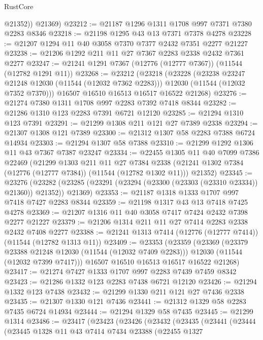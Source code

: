 \begin{lexlean}{RustCore}
\begin{coremodule}
          @21352))
      @21369)
@23212 := @21187 @1296 @1311 @1708 @997 @7371 @7380 @2283 @8346
@23218 := @21198 @1295 @43 @13 @7371 @7378 @4278
@23228 := @21207 @1294 @11 @40 @3058 @7370 @7377 @2432 @7351 @2277 @21227
@23238 := @21206 @1292 @211 @11 @27 @7367 @2283 @2338 @2432 @7361 @2277
@23247 := @21241 @1291 @7367 (@12776 (@12777 @7367)) (@11544 (@12782 @1291 @11))
@23268 := @23212
    (@23218
      (@23228
        (@23238 @23247 @21248 @12030 (@11544 (@12032 @7362 @2283)))
        @12030
        (@11544 (@12032 @7352 @7370)))
      @16507
      @16510
      @16513
      @16517
      @16522
      @21268)
@23276 := @21274 @7380 @1311 @1708 @997 @2283 @7392 @7418 @8344
@23282 := @21286 @1310 @123 @2283 @7391 @6721 @12120
@23285 := @21294 @1310 @123 @7391
@23291 := @21299 @1308 @211 @121 @27 @7389 @2338
@23294 := @21307 @1308 @121 @7389
@23300 := @21312 @1307 @58 @2283 @7388 @6724 @14934
@23303 := @21294 @1307 @58 @7388
@23310 := @21299 @1292 @1306 @11 @43 @7367 @7387 @23247
@23334 := @22455
    @1305
    @11
    @40
    @7099
    @7386
    @22469
    (@21299
      @1303
      @211
      @11
      @27
      @7384
      @2338
      (@21241 @1302 @7384 (@12776 (@12777 @7384)) (@11544 (@12782 @1302 @11)))
      @21352)
@23345 := @23276
    (@23282 (@23285 (@23291 (@23294 (@23300 (@23303 (@23310 @23334)) @21360)) @21352)) @21369)
@23353 := @21187 @1318 @1333 @1707 @997 @7418 @7427 @2283 @8344
@23359 := @21198 @1317 @43 @13 @7418 @7425 @4278
@23369 := @21207 @1316 @11 @40 @3058 @7417 @7424 @2432 @7398 @2277 @21227
@23379 := @21206 @1314 @211 @11 @27 @7414 @2283 @2338 @2432 @7408 @2277
@23388 := @21241 @1313 @7414 (@12776 (@12777 @7414)) (@11544 (@12782 @1313 @11))
@23409 := @23353
    (@23359
      (@23369
        (@23379 @23388 @21248 @12030 (@11544 (@12032 @7409 @2283)))
        @12030
        (@11544 (@12032 @7399 @7417)))
      @16507
      @16510
      @16513
      @16517
      @16522
      @21268)
@23417 := @21274 @7427 @1333 @1707 @997 @2283 @7439 @7459 @8342
@23423 := @21286 @1332 @123 @2283 @7438 @6721 @12120
@23426 := @21294 @1332 @123 @7438
@23432 := @21299 @1330 @211 @121 @27 @7436 @2338
@23435 := @21307 @1330 @121 @7436
@23441 := @21312 @1329 @58 @2283 @7435 @6724 @14934
@23444 := @21294 @1329 @58 @7435
@23445 := @21299 @1314
@23486 := @23417
    (@23423
      (@23426
        (@23432
          (@23435
            (@23441
              (@23444
                (@23445
                  @1328
                  @11
                  @43
                  @7414
                  @7434
                  @23388
                  (@22455
                    @1327

\end{coremodule}
\end{lexlean}
